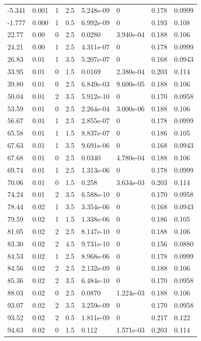\documentclass[preview]{standalone}
\begin{document}
{{\begin{tabular}{L{1.2cm}C{1.2cm} C{0.3cm}C{0.5cm} C{1.4cm}C{1.4cm} C{1.4cm}C{1.4cm}}
  -5.341  &  0.001  & 1     & 2.5 &  5.248e-09  & 0  & 0.178 &  0.0999   \\ 
  -1.777  &  0.000  & 1     & 0.5 &  6.992e-09  & 0  & 0.193 &  0.108   \\ 
  22.77  &  0.00  & 0     & 2.5 &  0.0280  & 3.940e-04  & 0.188 &  0.106   \\ 
  24.21  &  0.00  & 1     & 2.5 &  4.311e-07  & 0  & 0.178 &  0.0999   \\ 
  26.83  &  0.01  & 1     & 3.5 &  5.207e-07  & 0  & 0.168 &  0.0943   \\ 
  33.95  &  0.01  & 0     & 1.5 &  0.0169  & 2.380e-04  & 0.203 &  0.114   \\ 
  39.80  &  0.01  & 0     & 2.5 &  6.849e-03  & 9.600e-05  & 0.188 &  0.106   \\ 
  50.04  &  0.01  & 2     & 3.5 &  5.912e-10  & 0  & 0.170 &  0.0958   \\ 
  53.59  &  0.01  & 0     & 2.5 &  2.264e-04  & 3.000e-06  & 0.188 &  0.106   \\ 
  56.67  &  0.01  & 1     & 2.5 &  2.855e-07  & 0  & 0.178 &  0.0999   \\ 
  65.58  &  0.01  & 1     & 1.5 &  8.837e-07  & 0  & 0.186 &  0.105   \\ 
  67.63  &  0.01  & 1     & 3.5 &  9.691e-06  & 0  & 0.168 &  0.0943   \\ 
  67.68  &  0.01  & 0     & 2.5 &  0.0340  & 4.780e-04  & 0.188 &  0.106   \\ 
  69.74  &  0.01  & 1     & 2.5 &  1.313e-06  & 0  & 0.178 &  0.0999   \\ 
  70.06  &  0.01  & 0     & 1.5 &  0.258  & 3.634e-03  & 0.203 &  0.114   \\ 
  74.24  &  0.01  & 2     & 3.5 &  6.588e-10  & 0  & 0.170 &  0.0958   \\ 
  78.44  &  0.02  & 1     & 3.5 &  3.354e-06  & 0  & 0.168 &  0.0943   \\ 
  79.59  &  0.02  & 1     & 1.5 &  1.338e-06  & 0  & 0.186 &  0.105   \\ 
  81.05  &  0.02  & 2     & 2.5 &  8.147e-10  & 0  & 0.188 &  0.106   \\ 
  83.30  &  0.02  & 2     & 4.5 &  9.731e-10  & 0  & 0.156 &  0.0880   \\ 
  84.53  &  0.02  & 1     & 2.5 &  8.968e-06  & 0  & 0.178 &  0.0999   \\ 
  84.56  &  0.02  & 2     & 2.5 &  2.132e-09  & 0  & 0.188 &  0.106   \\ 
  85.36  &  0.02  & 2     & 3.5 &  6.484e-10  & 0  & 0.170 &  0.0958   \\ 
  88.03  &  0.02  & 0     & 2.5 &  0.0870  & 1.224e-03  & 0.188 &  0.106   \\ 
  93.07  &  0.02  & 2     & 3.5 &  3.259e-09  & 0  & 0.170 &  0.0958   \\ 
  93.52  &  0.02  & 2     & 0.5 &  1.811e-09  & 0  & 0.217 &  0.122   \\ 
  94.63  &  0.02  & 0     & 1.5 &  0.112  & 1.571e-03  & 0.203 &  0.114   \\ 
\hline 
\end{tabular} 

}}
\end{document}
